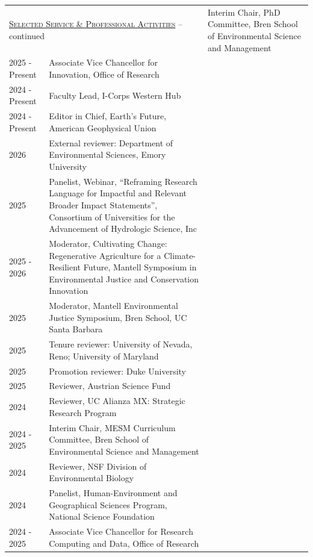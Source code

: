 
\begin{longtable}{l p{5.5in}}

\endfirsthead
\multicolumn{2}{l}{\hspace{.1in} \textsc{\underline{Selected Service \& Professional Activities}} -- continued
\vspace*{.1in} }  \endhead

2025 - Present & Interim Chair, PhD Committee, Bren School of Environmental Science and Management \\
2025 - Present & Associate Vice Chancellor for Innovation, Office of Research \\
2024 - Present & Faculty Lead, I-Corps Western Hub \\
2024 - Present & Editor in Chief, Earth's Future, American Geophysical Union \\
2026 & External reviewer: Department of Environmental Sciences, Emory University \\
2025 & Panelist, Webinar, ``Reframing Research Language for Impactful and Relevant Broader Impact Statements'', Consortium of Universities for the Advancement of Hydrologic Science, Inc \\
2025 - 2026 & Moderator, Cultivating Change: Regenerative Agriculture for a Climate-Resilient Future, Mantell Symposium in Environmental Justice and Conservation Innovation \\
2025 & Moderator, Mantell Environmental Justice Symposium, Bren School, UC Santa Barbara \\
2025 & Tenure reviewer: University of Nevada, Reno; University of Maryland \\
2025 & Promotion reviewer: Duke University \\
2025 & Reviewer, Austrian Science Fund \\
2024 & Reviewer, UC Alianza MX: Strategic Research Program \\
2024 - 2025 & Interim Chair, MESM Curriculum Committee, Bren School of Environmental Science and Management \\
2024 & Reviewer, NSF Division of Environmental Biology \\
2024 & Panelist, Human-Environment and Geographical Sciences Program, National Science Foundation \\
2024 - 2025 & Associate Vice Chancellor for Research Computing and Data, Office of Research \\

\end{longtable}
